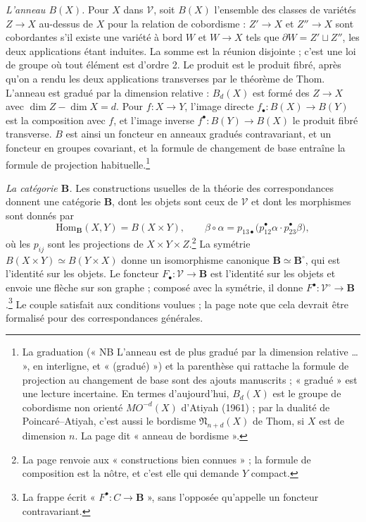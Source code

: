 \documentclass[11pt,a4paper]{article}
\begin{document}
\emph{L'anneau $B(X)$.} Pour $X$ dans $\mathcal{V}$, soit $B(X)$ l'ensemble des
classes de variétés $Z \to X$ au-dessus de $X$ pour la relation de cobordisme :
$Z' \to X$ et $Z'' \to X$ sont cobordantes s'il existe une variété à bord $W$ et
$W \to X$ tels que $\partial W = Z' \sqcup Z''$, les deux applications étant
induites. La somme est la réunion disjointe ; c'est une loi de groupe où tout
élément est d'ordre 2. Le produit est le produit fibré, après qu'on a rendu les
deux applications transverses par le théorème de Thom. L'anneau est gradué par
la dimension relative : $B_d(X)$ est formé des $Z \to X$ avec $\dim Z - \dim X
= d$. Pour $f : X \to Y$, l'image directe $f_\bullet : B(X) \to B(Y)$ est la
composition avec $f$, et l'image inverse $f^\bullet : B(Y) \to B(X)$ le produit
fibré transverse. $B$ est ainsi un foncteur en anneaux gradués contravariant,
et un foncteur en groupes covariant, et la formule de changement de base
entraîne la formule de projection habituelle.\footnote{La graduation (« NB
L'anneau est de plus gradué par la dimension relative … », en interligne, et
« (gradué) ») et la parenthèse qui rattache la formule de projection au
changement de base sont des ajouts manuscrits ; « gradué » est une lecture
incertaine. En termes d'aujourd'hui, $B_d(X)$ est le groupe de cobordisme non
orienté $MO^{-d}(X)$ d'Atiyah (1961) ; par la dualité de Poincaré--Atiyah,
c'est aussi le bordisme $\mathfrak{N}_{n+d}(X)$ de Thom, si $X$ est de
dimension $n$. La page dit « anneau de bordisme ».}

\emph{La catégorie $\mathbf{B}$.} Les constructions usuelles de la théorie des
correspondances donnent une catégorie $\mathbf{B}$, dont les objets sont ceux
de $\mathcal{V}$ et dont les morphismes sont donnés par
\[
\mathrm{Hom}_{\mathbf{B}}(X, Y) = B(X \times Y),
\qquad
\beta \circ \alpha = p_{13\bullet}\big(p_{12}^{\bullet}\alpha \cdot
p_{23}^{\bullet}\beta\big),
\]
où les $p_{ij}$ sont les projections de $X \times Y \times Z$.\footnote{La page
renvoie aux « constructions bien connues » ; la formule de composition est la
nôtre, et c'est elle qui demande $Y$ compact.} La symétrie $B(X \times Y)
\simeq B(Y \times X)$ donne un isomorphisme canonique $\mathbf{B} \simeq
\mathbf{B}^{\circ}$, qui est l'identité sur les objets. Le foncteur $F_\bullet
: \mathcal{V} \to \mathbf{B}$ est l'identité sur les objets et envoie une
flèche sur son graphe ; composé avec la symétrie, il donne $F^\bullet :
\mathcal{V}^{\circ} \to \mathbf{B}$.\footnote{La frappe écrit « $F^{\bullet} :
C \to \mathbf{B}$ », sans l'opposée qu'appelle un foncteur contravariant.} Le
couple satisfait aux conditions voulues ; la page note que cela devrait être
formalisé pour des correspondances générales.
\end{document}

